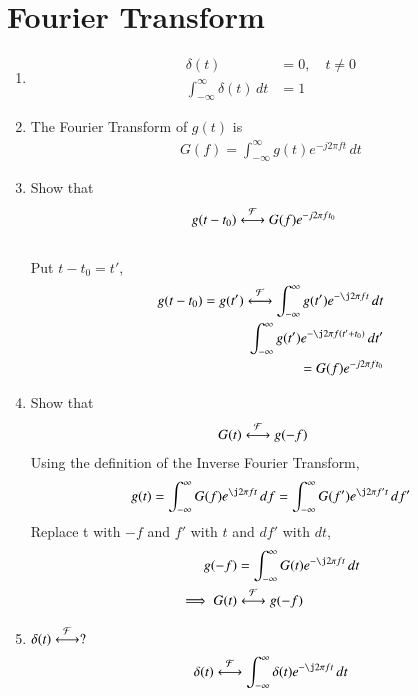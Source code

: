 \documentclass[journal,12pt,twocolumn]{IEEEtran}
\renewcommand\thesection{\arabic{section}}
\begin{document}
	\section{Fourier Transform}
	
	
	
	\begin{enumerate}[label=\thesection.\arabic*
		,ref=\thesection.\theenumi]
		\item 
		\begin{align}
			\delta(t)&=0, \quad t\neq0
			\\
			\int_{-\infty}^{\infty}\delta(t) \, dt&= 1
		\end{align}
		\item The Fourier Transform of $g(t)$ is
		\begin{align}
			G(f)=\int_{-\infty}^{\infty}g(t)e^{-j2\pi ft}\,dt
		\end{align}
		\item Show that 
		\begin{align}
			g(t-t_0)&\overset{\mathcal{F}}{ \longleftrightarrow}G(f)e^{-j2\pi ft_0}
		\end{align}
		\solution\\
		Put $t-t_0 = t'$,
		\begin{align}
			g(t-t_0) = g(t')\system{F}\int_{-\infty}^{\infty} g(t')e^{-\j2\pi ft}\,dt \\
			\int_{-\infty}^{\infty}	g(t')e^{-\j2\pi f(t' + t_0)}\,dt' \\
			=G(f)e^{-j2\pi ft_0}
		\end{align}
		\item Show that 
		\begin{align}
			G(t)&\overset{\mathcal{F}}{ \longleftrightarrow}g(-f)
		\end{align}
		\solution Using the definition of the Inverse Fourier Transform,
		\begin{align}
			g(t)=\int_{-\infty}^{\infty}G(f)e^{\j2\pi ft}\,df
			=\int_{-\infty}^{\infty}G(f')e^{\j2\pi f't}\,df'
			\label{eq:duality}
		\end{align}
		Replace t with $-f$ and $f'$ with $t$ and $df'$ with $dt$,
		\begin{align}
			g(-f)&=\int_{-\infty}^{\infty}G(t)e^{-\j2\pi ft}\,dt \\
			\implies G(t)&\system{F}g(-f)
			\label{eq:duality}
		\end{align}
		\item $\delta(t)\overset{\mathcal{F}}{ \longleftrightarrow}?$\\
		\solution
		\begin{align}
			\delta(t)\system{F}\int_{-\infty}^{\infty}\delta(t)e^{-\j2\pi ft}\, dt \\

\end{align}
\end{enumerate}
\end{document}
